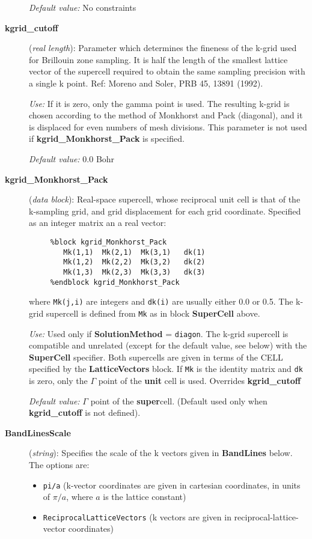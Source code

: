 \begin{description}
{\it Default value:} No constraints


\item[{\bf kgrid\_cutoff}] ({\it real length}):
Parameter which determines
the fineness of the k-grid used for Brillouin zone sampling.
It is half the length of the smallest lattice vector of the supercell 
required to obtain the same sampling precision with a single k point.
Ref: Moreno and Soler, PRB 45, 13891 (1992).

{\it Use:} If it is zero, only the gamma point is used.
The resulting k-grid is chosen according to the method of
Monkhorst and Pack (diagonal), and it is displaced for even numbers 
of mesh divisions.
This parameter is not used if {\bf kgrid\_Monkhorst\_Pack} is specified.

{\it Default value:} 0.0 Bohr
        

\item[{\bf kgrid\_Monkhorst\_Pack}] ({\it data block}): 
Real-space supercell, whose reciprocal unit cell is that of the
k-sampling grid, and grid displacement for each grid coordinate.
Specified as an integer matrix an a real vector:

\begin{verbatim}
     %block kgrid_Monkhorst_Pack
        Mk(1,1)  Mk(2,1)  Mk(3,1)   dk(1) 
        Mk(1,2)  Mk(2,2)  Mk(3,2)   dk(2) 
        Mk(1,3)  Mk(2,3)  Mk(3,3)   dk(3) 
     %endblock kgrid_Monkhorst_Pack 
\end{verbatim}

where {\tt Mk(j,i)} are integers and {\tt dk(i)} are usually
either 0.0 or 0.5. The k-grid supercell is defined from {\tt Mk}
as in block {\bf SuperCell} above.

{\it Use:} Used only if {\bf SolutionMethod} = {\tt diagon}.
The k-grid supercell is compatible and unrelated 
(except for the default value, see below)
with the {\bf SuperCell} specifier. Both supercells are given in 
terms of the CELL specified by the {\bf LatticeVectors} block.
If {\tt Mk} is the identity matrix and {\tt dk} 
is zero, only the $\Gamma$ point of the {\bf unit} cell is used. 
Overrides {\bf kgrid\_cutoff}

{\it Default value:} $\Gamma$ point of the {\bf super}cell.
(Default used only when {\bf kgrid\_cutoff} is not defined).
        


\item[{\bf BandLinesScale}] ({\it string}): 
Specifies the scale of the k vectors given in {\bf BandLines} below.
The options are:
\begin{itemize}
\item {\tt pi/a} (k-vector coordinates are given in cartesian 
coordinates, in units of $\pi/a$, where $a$ is the lattice constant)
\item {\tt ReciprocalLatticeVectors} (k vectors are given in
reciprocal-lattice-vector coordinates)
\end{itemize}


\end{description}
